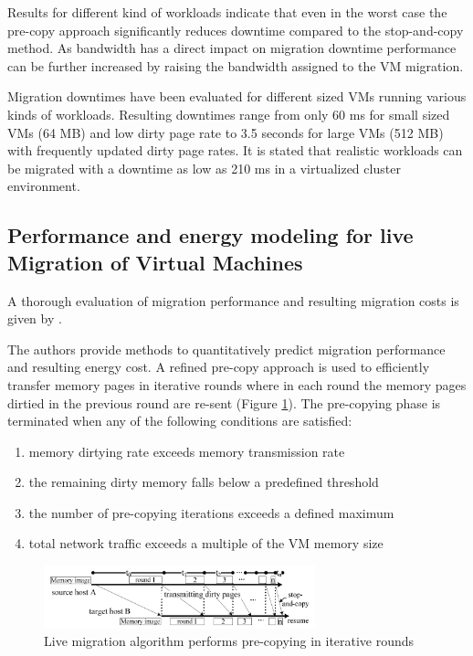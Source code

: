 Results for different kind of workloads indicate that even in the worst case the pre-copy approach significantly reduces downtime compared to the stop-and-copy method. As bandwidth has a direct impact on migration downtime performance can be further increased by raising the bandwidth assigned to the VM migration. 

Migration downtimes have been evaluated for different sized VMs running various kinds of workloads. Resulting downtimes range from only 60 ms for small sized VMs (64 MB) and low dirty page rate to 3.5 seconds for large VMs (512 MB) with frequently updated dirty page rates. It is stated that realistic workloads can be migrated with a downtime as low as 210 ms in a virtualized cluster environment. 


\subsection{Performance and energy modeling for live Migration of Virtual Machines}

A thorough evaluation of migration performance and resulting migration costs is given by \cite{liu2013performance}. 

The authors provide methods to quantitatively predict migration performance and resulting energy cost. A refined pre-copy approach is used to efficiently transfer memory pages in iterative rounds where in each round the memory pages dirtied in the previous round are re-sent (Figure \ref{fig:VM_migration_precopy}). 
The pre-copying phase is terminated when any of the following conditions are satisfied:

\begin{enumerate}
	\item [1)] memory dirtying rate exceeds memory transmission rate
	\item [2)] the remaining dirty memory falls below a predefined threshold
	\item [3)] the number of pre-copying iterations exceeds a defined maximum
	\item [4)] total network traffic exceeds a multiple of the VM memory size
\end{enumerate}

\begin{figure}[htbp]
	\centering
		\includegraphics[width=0.7\textwidth]{figures/state_of_the_art/VM_migration_precopy.PNG}
	\caption{Live migration algorithm performs pre-copying in iterative rounds \cite{liu2013performance}}
	\label{fig:VM_migration_precopy}
\end{figure}

